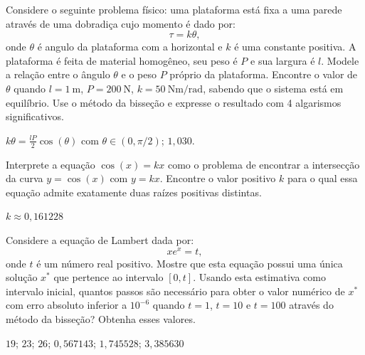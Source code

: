 \begin{Exercise}[title=Estática] Considere o seguinte problema físico: uma plataforma está fixa a uma parede através de uma dobradiça cujo momento é dado por:
  \begin{equation*}
    \tau=k\theta,
  \end{equation*}
onde $\theta$ é angulo da plataforma com a horizontal e $k$ é uma constante positiva. A plataforma é feita de material homogêneo, seu peso é $P$ e sua largura é $l$. Modele a relação entre o ângulo $\theta$ e o peso $P$ próprio da plataforma. Encontre o valor de $\theta$ quando $l=1~\mbox{m}$, $P=200~\mbox{N}$, $k=50~\mbox{Nm}/\mbox{rad}$, sabendo que o sistema está em equilíbrio. Use o método da bisseção e expresse o resultado com 4 algarismos significativos.
\end{Exercise}
\begin{Answer}
  \begin{tiny}
    $k\theta=\frac{lP}{2}\cos(\theta)$ com $\theta\in (0, \pi/2)$; $1,030$.
  \end{tiny}
\end{Answer}

\begin{Exercise} Interprete a equação $\cos(x)=kx$ como o problema de encontrar a intersecção da curva $y=\cos(x)$ com $y=kx$. Encontre o valor positivo $k$ para o qual essa equação admite exatamente duas raízes positivas distintas.
\end{Exercise}
\begin{Answer}
  \begin{tiny}
    $k\approx 0,161228$
  \end{tiny}
\end{Answer}

\begin{Exercise} Considere a equação de Lambert dada por:
  \begin{equation*}
    xe^x= t,
  \end{equation*}
onde $t$ é um número real positivo. Mostre que esta equação possui uma única solução $x^*$ que pertence ao intervalo $[0, t]$. Usando esta estimativa como intervalo inicial, quantos passos são necessário para obter o valor numérico de $x^*$ com erro absoluto inferior a $10^{-6}$ quando $t=1$, $t=10$ e $t=100$ através do método da bisseção? Obtenha esses valores.
\end{Exercise}
\begin{Answer}
  \begin{tiny}
    $19$; $23$; $26$; $0,567143$; $1,745528$; $3,385630$
  \end{tiny}
\end{Answer}


